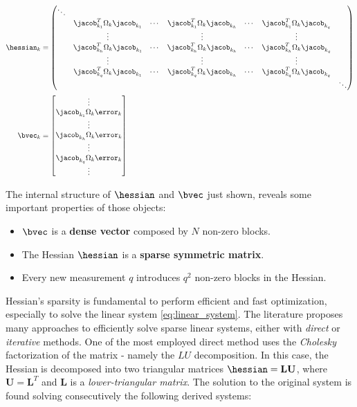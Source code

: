 \begin{align}
    \label{eq:sparse_hessian_structure}
    \hessian_k &= 
        \begin{pmatrix}
            \ddots &  &  &  &  &  &\\
             & \jacob_{k_1}^T\Omega_k\jacob_{k_1} & \cdots & \jacob_{k_1}^T\Omega_k\jacob_{k_h} & \cdots & \jacob_{k_1}^T\Omega_k\jacob_{k_q} & \\
             & \vdots & & \vdots & & \vdots & \\
             & \jacob_{k_h}^T\Omega_k\jacob_{k_1} & \cdots & \jacob_{k_h}^T\Omega_k\jacob_{k_h} & \cdots & \jacob_{k_h}^T\Omega_k\jacob_{k_q} & \\
             & \vdots & & \vdots & & \vdots & \\
             & \jacob_{k_q}^T\Omega_k\jacob_{k_1} & \cdots & \jacob_{k_q}^T\Omega_k\jacob_{k_h} & \cdots & \jacob_{k_q}^T\Omega_k\jacob_{k_q} & \\
             &  &  &  &  &  & \ddots \\
        \end{pmatrix} \\
    \bvec_k &= 
        \begin{bmatrix}
            \vdots \\
            \jacob_{k_1}\Omega_k\error_k \\
            \vdots \\
            \jacob_{k_h}\Omega_k\error_k \\
            \vdots \\
            \jacob_{k_q}\Omega_k\error_k \\
            \vdots
        \end{bmatrix}
    \label{eq:rhs_structure}
\end{align}

The internal structure of $\hessian$ and $\bvec$ just shown, reveals some important properties of those objects:

\begin{itemize}
    \item $\bvec$ is a \textbf{dense vector} composed by $N$ non-zero blocks. 
    \item The Hessian $\hessian$ is a \textbf{sparse symmetric matrix}.
    \item Every new measurement $q$ introduces $q^2$ non-zero blocks in the Hessian.
\end{itemize}

Hessian's sparsity is fundamental to perform efficient and fast optimization, especially to solve the linear system \ref{eq:linear_system}. The literature proposes many approaches to efficiently solve sparse linear systems, either with \textit{direct} \cite{davis2006directSPsolvers} or \textit{iterative} \cite{saad2003iterativeSPsolvers} methods. One of the most employed direct method uses the \textit{Cholesky} factorization of the matrix - namely the $LU$ decomposition. In this case, the Hessian is decomposed into two triangular matrices $\hessian = \mathbf{L}\mathbf{U}$, where $\mathbf{U} = \mathbf{L}^T$ and $\mathbf{L}$ is a \textit{lower-triangular matrix}. The solution to the original system is found solving consecutively the following derived systems:

